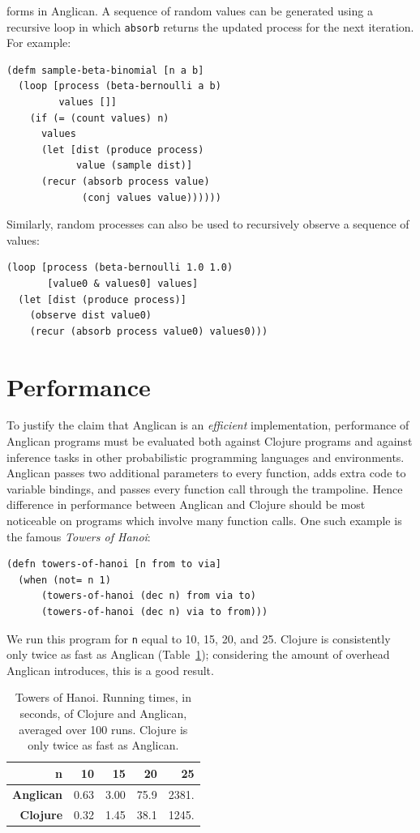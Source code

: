 \documentclass[preprint]{sigplanconf}
\begin{document}
forms in Anglican. A sequence of random values can be generated
using a recursive loop in which \texttt{absorb} returns the
updated process for the next iteration. For example:
\begin{lstlisting}[style=default]
(defm sample-beta-binomial [n a b]
  (loop [process (beta-bernoulli a b)
         values []]
    (if (= (count values) n)
      values
      (let [dist (produce process)
            value (sample dist)]
      (recur (absorb process value)
             (conj values value))))))
\end{lstlisting}
Similarly, random processes can also be used to recursively
observe a sequence of values:
\begin{lstlisting}[style=default]
(loop [process (beta-bernoulli 1.0 1.0)
       [value0 & values0] values] 
  (let [dist (produce process)]
    (observe dist value0)
    (recur (absorb process value0) values0)))
\end{lstlisting}

\section{Performance}

To justify the claim that Anglican is an \textit{efficient}
implementation, performance of Anglican programs must be evaluated
both against Clojure programs and against inference tasks in
other probabilistic programming languages and environments.
Anglican passes two additional parameters to every function, adds
extra code to variable bindings, and passes every function
call through the trampoline. Hence difference in performance
between Anglican and Clojure should be most noticeable on
programs which involve many function calls. One such example is
the famous \textit{Towers of Hanoi}:

\begin{lstlisting}[style=default]
(defn towers-of-hanoi [n from to via]
  (when (not= n 1)
      (towers-of-hanoi (dec n) from via to)
      (towers-of-hanoi (dec n) via to from)))
\end{lstlisting}

We run this program for \texttt{n} equal to 10, 15, 20, and 25. Clojure
is consistently only twice as fast as Anglican
(Table~\ref{tbl:hanoi}); considering the amount of overhead
Anglican introduces, this is a good result.
\begin{table}
    \centering
    \begin{tabular}{r|r|r|r|r}
        {\bf n}  & 10 & 15 & 20 & 25 \\ \hline
        {\bf Anglican} & 0.63 & 3.00 & 75.9 & 2381.  \\ \hline
        {\bf Clojure} &  0.32 & 1.45 & 38.1  &  1245.
    \end{tabular}
    \caption{Towers of Hanoi. Running times, in
    seconds, of Clojure and Anglican, averaged over 100 runs.
    Clojure is only twice as fast as Anglican.}
    \label{tbl:hanoi}
\end{table}
\end{document}
